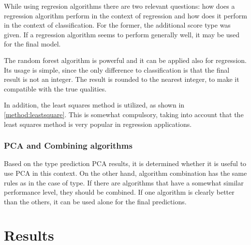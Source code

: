 \documentclass[twoside]{article}
\begin{document}
\begin{multicols}{2}
While using regresion algorithms there are two relevant questions: how does a regression algorithm perform in the context
of regression and how does it perform in the context of classification. For the former, the additional score type was
given. If a regression algorithm seems to perform generally well, it may be used for the final model.

The random forest algorithm is powerful and it can be applied also for regression. Its usage is simple,
since the only difference to classification is that the final result is not an integer. The result is rounded to the nearest
integer, to make it compatible with the true qualities.

In addition, the least squares method is utilized, as shown in \ref{method:leastsquare}. This is somewhat compulsory, taking
into account that the least squares method is very popular in regression applications.

\subsubsection{PCA and Combining algorithms}

Based on the type prediction PCA results, it is determined whether it is useful to use PCA 
in this context. On the other hand, algorithm combination has the same rules as in the case of 
type. If there are algorithms that have a somewhat similar performance level, they should be
combined. If one algorithm is clearly better than the others, it can be used alone for the final predictions.



\section{Results}


\end{multicols}
\end{document}
